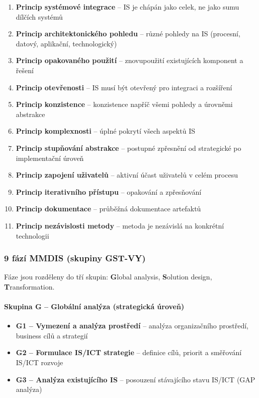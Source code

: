 \begin{enumerate}
  \item \textbf{Princip systémové integrace} -- IS je chápán jako celek, ne jako sumu dílčích systémů
  \item \textbf{Princip architektonického pohledu} -- různé pohledy na IS (procesní, datový, aplikační, technologický)
  \item \textbf{Princip opakovaného použití} -- znovupoužití existujících komponent a řešení
  \item \textbf{Princip otevřenosti} -- IS musí být otevřený pro integraci a rozšíření
  \item \textbf{Princip konzistence} -- konzistence napříč všemi pohledy a úrovněmi abstrakce
  \item \textbf{Princip komplexnosti} -- úplné pokrytí všech aspektů IS
  \item \textbf{Princip stupňování abstrakce} -- postupné zpřesnění od strategické po implementační úroveň
  \item \textbf{Princip zapojení uživatelů} -- aktivní účast uživatelů v celém procesu
  \item \textbf{Princip iterativního přístupu} -- opakování a zpřesňování
  \item \textbf{Princip dokumentace} -- průběžná dokumentace artefaktů
  \item \textbf{Princip nezávislosti metody} -- metoda je nezávislá na konkrétní technologii
\end{enumerate}

\subsubsection{9 fází MMDIS (skupiny GST-VY)}

Fáze jsou rozděleny do tří skupin: \textbf{G}lobal analysis, \textbf{S}olution design, \textbf{T}ransformation.

\paragraph{Skupina G -- Globální analýza (strategická úroveň)}
\begin{itemize}
  \item \textbf{G1 -- Vymezení a analýza prostředí} -- analýza organizačního prostředí, business cílů a strategií
  \item \textbf{G2 -- Formulace IS/ICT strategie} -- definice cílů, priorit a směřování IS/ICT rozvoje
  \item \textbf{G3 -- Analýza existujícího IS} -- posouzení stávajícího stavu IS/ICT (GAP analýza)
\end{itemize}

